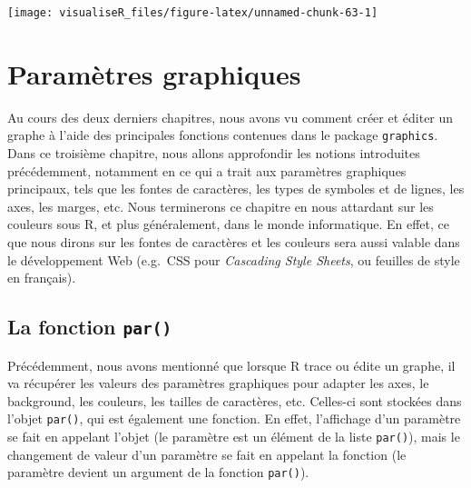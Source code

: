 \documentclass[]{article}
\newenvironment{Shaded}{\begin{snugshade}}{\end{snugshade}}
\newcommand{\CommentTok}[1]{\textcolor[rgb]{0.56,0.35,0.01}{\textit{#1}}}
\newcommand{\KeywordTok}[1]{\textcolor[rgb]{0.13,0.29,0.53}{\textbf{#1}}}
\newcommand{\NormalTok}[1]{#1}
\newcommand{\OperatorTok}[1]{\textcolor[rgb]{0.81,0.36,0.00}{\textbf{#1}}}
\begin{document}
\begin{center}\texttt{[image: visualiseR\_files/figure-latex/unnamed-chunk-63-1]} \end{center}

\hypertarget{paramuxe8tres-graphiques}{%
\section{Paramètres graphiques}\label{paramuxe8tres-graphiques}}

Au cours des deux derniers chapitres, nous avons vu comment créer et éditer un graphe à l'aide des principales fonctions contenues dans le package \texttt{graphics}. Dans ce troisième chapitre, nous allons approfondir les notions introduites précédemment, notamment en ce qui a trait aux paramètres graphiques principaux, tels que les fontes de caractères, les types de symboles et de lignes, les axes, les marges, etc. Nous terminerons ce chapitre en nous attardant sur les couleurs sous R, et plus généralement, dans le monde informatique. En effet, ce que nous dirons sur les fontes de caractères et les couleurs sera aussi valable dans le développement Web (e.g.~CSS pour \emph{Cascading Style Sheets}, ou feuilles de style en français).

\hypertarget{la-fonction-par}{%
\subsection{\texorpdfstring{La fonction \texttt{par()}}{La fonction par()}}\label{la-fonction-par}}

Précédemment, nous avons mentionné que lorsque R trace ou édite un graphe, il va récupérer les valeurs des paramètres graphiques pour adapter les axes, le background, les couleurs, les tailles de caractères, etc. Celles-ci sont stockées dans l'objet \texttt{par()}, qui est également une fonction. En effet, l'affichage d'un paramètre se fait en appelant l'objet (le paramètre est un élément de la liste \texttt{par()}), mais le changement de valeur d'un paramètre se fait en appelant la fonction (le paramètre devient un argument de la fonction \texttt{par()}).

\begin{Shaded}
\end{Shaded}
\end{document}
